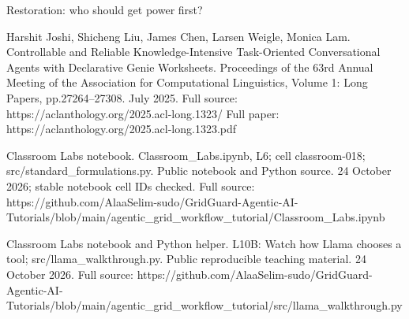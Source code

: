 \begin{frame}[t]{Restoration: who should get power first?}
{Harshit Joshi, Shicheng Liu, James Chen, Larsen Weigle, Monica Lam. Controllable and Reliable Knowledge-Intensive Task-Oriented Conversational Agents with Declarative Genie Worksheets. Proceedings of the 63rd Annual Meeting of the Association for Computational Linguistics, Volume 1: Long Papers, pp.27264--27308. July 2025.
Full source: https://aclanthology.org/2025.acl-long.1323/
Full paper: https://aclantho\allowbreak{}logy.org/2025.ac\allowbreak{}l-long.1323.pdf

Classroom Labs notebook. Classroom\_Labs.ipynb, L6; cell classroom-018; src/standard\_formulations.py. Public notebook and Python source. 24 October 2026; stable notebook cell IDs checked.
Full source: https://github.c\allowbreak{}om/AlaaSelim-sud\allowbreak{}o/GridGuard-Agen\allowbreak{}tic-AI-Tutorials\allowbreak{}/blob/main/agent\allowbreak{}ic\_grid\_workflow\allowbreak{}\_tutorial/Classr\allowbreak{}oom\_Labs.ipynb

Classroom Labs notebook and Python helper. L10B: Watch how Llama chooses a tool; src/llama\_walkthrough.py. Public reproducible teaching material. 24 October 2026.
Full source: https://github.c\allowbreak{}om/AlaaSelim-sud\allowbreak{}o/GridGuard-Agen\allowbreak{}tic-AI-Tutorials\allowbreak{}/blob/main/agent\allowbreak{}ic\_grid\_workflow\allowbreak{}\_tutorial/src/ll\allowbreak{}ama\_walkthrough.\allowbreak{}py}
\end{frame}

